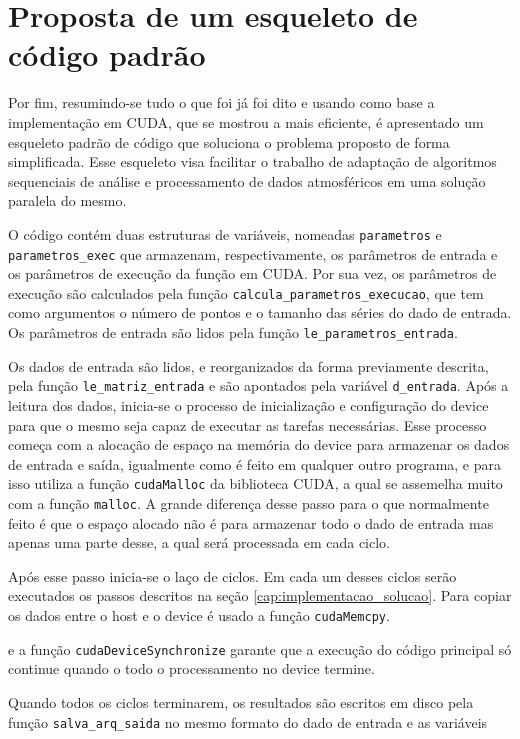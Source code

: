 \chapter{Proposta de um esqueleto de código padrão}

Por fim, resumindo-se tudo o que foi já foi dito e usando como base a implementação em CUDA, que se mostrou a mais eficiente, é apresentado um esqueleto padrão de código que soluciona o problema proposto de forma simplificada. Esse esqueleto visa facilitar o trabalho de adaptação de algoritmos sequenciais de análise e processamento de dados atmosféricos em uma solução paralela do mesmo. 

O código contém duas estruturas de variáveis, nomeadas \texttt{parametros} e \texttt{parametros\_exec} que armazenam, respectivamente, os parâmetros de entrada e os parâmetros de execução da função em CUDA. Por sua vez, os parâmetros de execução são calculados pela função \texttt{calcula\_parametros\_execucao}, que tem como argumentos o número de pontos e o tamanho das séries do dado de entrada. Os parâmetros de entrada são lidos pela função \texttt{le\_parametros\_entrada}.

Os dados de entrada são lidos, e reorganizados da forma previamente descrita, pela função \texttt{le\_matriz\_entrada} e são apontados pela variável \texttt{d\_entrada}. Após a leitura dos dados, inicia-se o processo de inicialização e configuração do device para que o mesmo seja capaz de executar as tarefas necessárias. Esse processo começa com a alocação de espaço na memória do device para armazenar os dados de entrada e saída, igualmente como é feito em qualquer outro programa, e para isso utiliza a função \texttt{cudaMalloc} da biblioteca CUDA, a qual se assemelha muito com a função \texttt{malloc}. A grande diferença desse passo para o que normalmente feito é que o espaço alocado não é para armazenar todo o dado de entrada mas apenas uma parte desse, a qual será processada em cada ciclo.

Após esse passo inicia-se o laço de ciclos. Em cada um desses ciclos serão executados os passos descritos na seção \ref{cap:implementacao_solucao}. Para copiar os dados entre o host e o device é usado a função \texttt{cudaMemcpy}.


 e a função \texttt{cudaDeviceSynchronize} garante que a execução do código principal só continue quando o todo o processamento no device termine.

Quando todos os ciclos terminarem, os resultados são escritos em disco pela função \texttt{salva\_arq\_saida} no mesmo formato do dado de entrada e as variáveis

